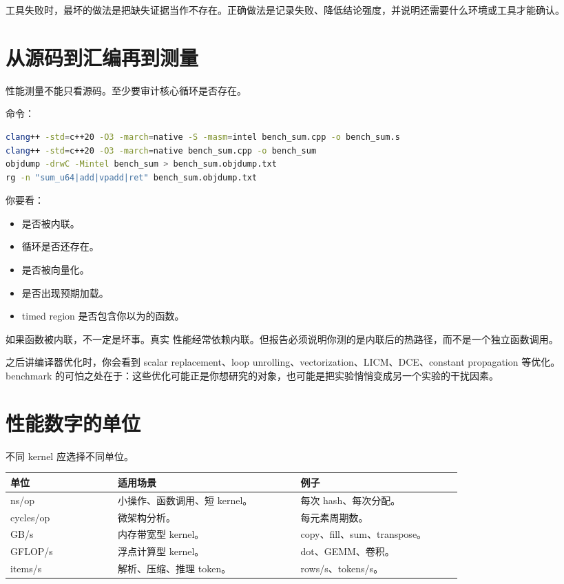 \begin{warningbox}
工具失败时，最坏的做法是把缺失证据当作不存在。正确做法是记录失败、降低结论强度，并说明还需要什么环境或工具才能确认。
\end{warningbox}

\section{从源码到汇编再到测量}

性能测量不能只看源码。至少要审计核心循环是否存在。

命令：

\begin{lstlisting}[language=bash]
clang++ -std=c++20 -O3 -march=native -S -masm=intel bench_sum.cpp -o bench_sum.s
clang++ -std=c++20 -O3 -march=native bench_sum.cpp -o bench_sum
objdump -drwC -Mintel bench_sum > bench_sum.objdump.txt
rg -n "sum_u64|add|vpadd|ret" bench_sum.objdump.txt
\end{lstlisting}

你要看：

\begin{itemize}
  \item {} 是否被内联。
  \item 循环是否还存在。
  \item 是否被向量化。
  \item 是否出现预期加载。
  \item timed region 是否包含你以为的函数。
\end{itemize}

如果函数被内联，不一定是坏事。真实  性能经常依赖内联。但报告必须说明你测的是内联后的热路径，而不是一个独立函数调用。

\begin{deepdive}
之后讲编译器优化时，你会看到 scalar replacement、loop unrolling、vectorization、LICM、DCE、constant propagation 等优化。benchmark 的可怕之处在于：这些优化可能正是你想研究的对象，也可能是把实验悄悄变成另一个实验的干扰因素。
\end{deepdive}

\section{性能数字的单位}

不同 kernel 应选择不同单位。

\begin{center}
\begin{tabular}{p{0.20\linewidth}p{0.34\linewidth}p{0.30\linewidth}}
\toprule
单位 & 适用场景 & 例子 \\
\midrule
ns/op & 小操作、函数调用、短 kernel。 & 每次 hash、每次分配。 \\
cycles/op & 微架构分析。 & 每元素周期数。 \\
GB/s & 内存带宽型 kernel。 & copy、fill、sum、transpose。 \\
GFLOP/s & 浮点计算型 kernel。 & dot、GEMM、卷积。 \\
items/s & 解析、压缩、推理 token。 & rows/s、tokens/s。 \\
\bottomrule
\end{tabular}
\end{center}

